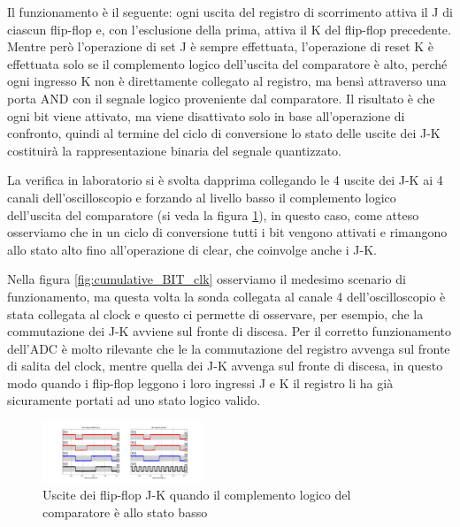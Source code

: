 \documentclass[journal]{IEEEtran}
\begin{document}
Il funzionamento è il seguente: ogni uscita del registro di scorrimento attiva il J di ciascun flip-flop e, con l'esclusione della prima, attiva il K del flip-flop precedente. Mentre però l'operazione di set J è sempre effettuata, l'operazione di reset K è effettuata solo se il complemento logico dell'uscita del comparatore è alto, perché ogni ingresso K non è direttamente collegato al registro, ma bensì attraverso una porta AND con il segnale logico proveniente dal comparatore. Il risultato è che ogni bit viene attivato, ma viene disattivato solo in base all'operazione di confronto, quindi al termine del ciclo di conversione lo stato delle uscite dei J-K costituirà la rappresentazione binaria del segnale quantizzato. 

La verifica in laboratorio si è svolta dapprima collegando le 4 uscite dei J-K ai 4 canali dell'oscilloscopio e forzando al livello basso il complemento logico dell'uscita del comparatore (si veda la figura \ref{fig:cumulative_BIT}), in questo caso, come atteso osserviamo che in un ciclo di conversione tutti i bit vengono attivati e rimangono allo stato alto fino all'operazione di clear, che coinvolge anche i J-K.

Nella figura \ref{fig:cumulative_BIT_clk} osserviamo il medesimo scenario di funzionamento, ma questa volta la sonda collegata al canale 4 dell'oscilloscopio è stata collegata al clock e questo ci permette di osservare, per esempio, che la commutazione dei J-K avviene sul fronte di discesa. Per il corretto funzionamento dell'ADC è molto rilevante che le la commutazione del registro avvenga sul fronte di salita del clock, mentre quella dei J-K avvenga sul fronte di discesa, in questo modo quando i flip-flop leggono i loro ingressi J e K il registro li ha già sicuramente portati ad uno stato logico valido.

\begin{figure}[H]%
\begin{center}
\includegraphics[trim = {100 0 550 0}, clip, width=0.43\textwidth]{analysis/output/cumulative_BIT.pdf}
\caption{Uscite dei flip-flop J-K quando il complemento logico del comparatore è allo stato basso}
\label{fig:cumulative_BIT}
\end{center}
\end{figure}
\end{document}
